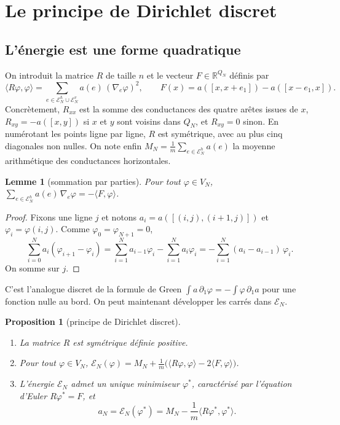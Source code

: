 \documentclass[11pt,a4paper]{article}
\theoremstyle{plain}
\newtheorem{proposition}[theoreme]{Proposition}
\newtheorem{lemme}[theoreme]{Lemme}
\theoremstyle{definition}
\theoremstyle{remark}
\newcommand{\R}{\mathbb{R}}
\newcommand{\E}{\mathcal{E}}
\newcommand{\ps}[2]{\langle #1,#2\rangle}
\begin{document}
\section{Le principe de Dirichlet discret}

\subsection{L'énergie est une forme quadratique}

On introduit la matrice $R$ de taille $n$ et le vecteur $F\in\R^{Q_N}$ définis par
\[
  \ps{R\varphi}{\varphi}=\sum_{e\in\E^h_N\cup\E^v_N}a(e)\,(\nabla_e\varphi)^2,
  \qquad
  F(x)=a([x,x+e_1])-a([x-e_1,x]) .
\]
Concrètement, $R_{xx}$ est la somme des conductances des quatre arêtes issues de $x$, $R_{xy}=-a([x,y])$ si $x$ et $y$ sont voisins dans $Q_N$, et $R_{xy}=0$ sinon. En numérotant les points ligne par ligne, $R$ est symétrique, avec au plus cinq diagonales non nulles. On note enfin $M_N=\frac1m\sum_{e\in\E^h_N}a(e)$ la moyenne arithmétique des conductances horizontales.

\begin{lemme}[sommation par parties]\label{lem:ipp}
Pour tout $\varphi\in V_N$, $\displaystyle\sum_{e\in\E^h_N}a(e)\,\nabla_e\varphi=-\ps{F}{\varphi}$.
\end{lemme}

\begin{proof}
Fixons une ligne $j$ et notons $a_i=a([(i,j),(i+1,j)])$ et $\varphi_i=\varphi(i,j)$. Comme $\varphi_0=\varphi_{N+1}=0$,
\[
  \sum_{i=0}^{N}a_i(\varphi_{i+1}-\varphi_i)=\sum_{i=1}^{N}a_{i-1}\varphi_i-\sum_{i=1}^{N}a_i\varphi_i=-\sum_{i=1}^{N}(a_i-a_{i-1})\,\varphi_i .
\]
On somme sur $j$.
\end{proof}

C'est l'analogue discret de la formule de Green $\int a\,\partial_1\varphi=-\int\varphi\,\partial_1a$ pour une fonction nulle au bord. On peut maintenant développer les carrés dans $\E_N$.

\begin{proposition}[principe de Dirichlet discret]\label{prop:dirichlet}
\begin{enumerate}[nosep]
\item La matrice $R$ est symétrique définie positive.
\item Pour tout $\varphi\in V_N$, $\E_N(\varphi)=M_N+\frac1m\big(\ps{R\varphi}{\varphi}-2\ps{F}{\varphi}\big)$.
\item L'énergie $\E_N$ admet un unique minimiseur $\varphi^*$, caractérisé par l'équation d'Euler $R\varphi^*=F$, et
\[
  a_N=\E_N(\varphi^*)=M_N-\frac1m\ps{R\varphi^*}{\varphi^*}.
\]
\end{enumerate}
\end{proposition}
\end{document}
